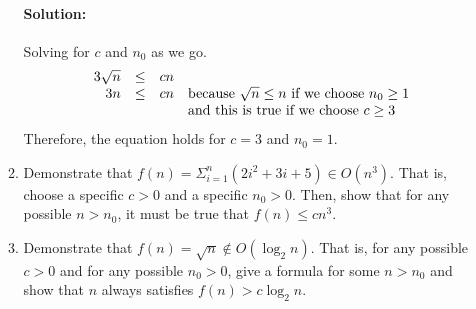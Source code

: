 \documentclass{article}
\begin{document}
\begin{enumerate}
\begin{enumerate}
    \paragraph{Solution:} Solving for \(c\) and \(n_0\) as we go.
    \[
    \begin{array}{rcll}
      3 \sqrt{n} &\leq& cn \\
      3n &\leq& cn
      & $because $ \sqrt{n} \leq n $ if we choose $ n_0 \geq 1 \\
      &&& $and this is true if we choose $ c \geq 3
    \end{array}
    \]
    Therefore, the equation holds for \(c=3\) and \(n_0=1\).

    \bigskip

  \item Demonstrate that
    \(f(n) = \Sigma_{i=1}^{n} (2i^2+3i+5) \in O(n^3)\).
    That is, choose a specific \(c>0\) and a specific \(n_0 > 0\).
    Then, show that for any possible \(n > n_0\), it must be true that
    \(f(n) \leq c n^3\).

    \bigskip

  \item Demonstrate that
    \(f(n) = \sqrt{n} \not\in O(\log_2 n)\).
    That is, for any possible \(c>0\) and for any possible \(n_0 > 0\), give a
    formula for some \(n > n_0\) and show that \(n\) always satisfies
    \(f(n) > c \log_2 n\).

  \end{enumerate}

\end{enumerate}
\end{document}

